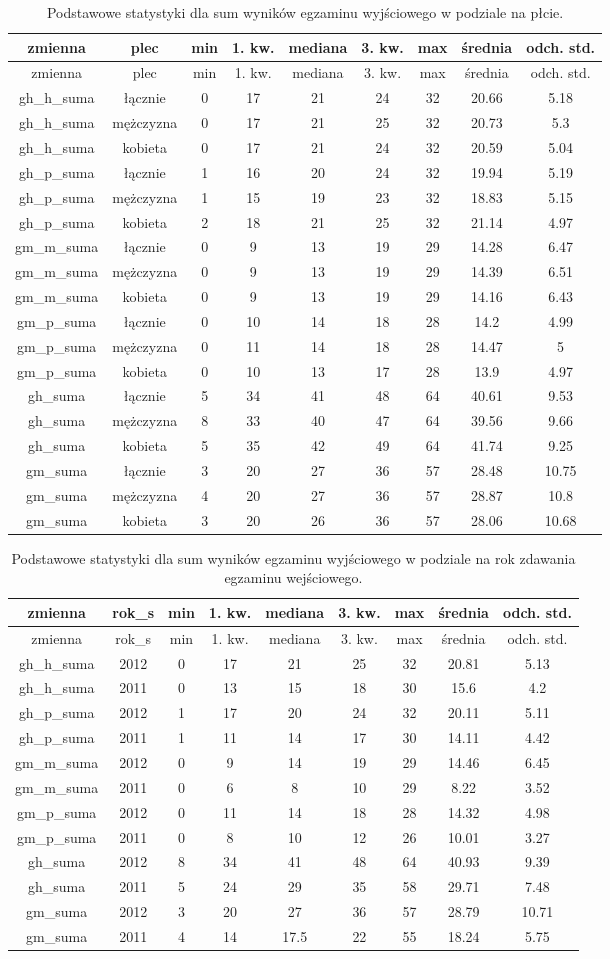 \documentclass[]{article}
\begin{document}
\begin{longtable}[c]{@{}ccccccccc@{}}
\caption{Podstawowe statystyki dla sum wyników egzaminu wyjściowego w
podziale na płcie.}\tabularnewline
\toprule
zmienna & plec & min & 1. kw. & mediana & 3. kw. & max & średnia & odch.
std.\tabularnewline
\midrule
\endfirsthead
\toprule
zmienna & plec & min & 1. kw. & mediana & 3. kw. & max & średnia & odch.
std.\tabularnewline
\midrule
\endhead
gh\_h\_suma & łącznie & 0 & 17 & 21 & 24 & 32 & 20.66 &
5.18\tabularnewline
gh\_h\_suma & mężczyzna & 0 & 17 & 21 & 25 & 32 & 20.73 &
5.3\tabularnewline
gh\_h\_suma & kobieta & 0 & 17 & 21 & 24 & 32 & 20.59 &
5.04\tabularnewline
gh\_p\_suma & łącznie & 1 & 16 & 20 & 24 & 32 & 19.94 &
5.19\tabularnewline
gh\_p\_suma & mężczyzna & 1 & 15 & 19 & 23 & 32 & 18.83 &
5.15\tabularnewline
gh\_p\_suma & kobieta & 2 & 18 & 21 & 25 & 32 & 21.14 &
4.97\tabularnewline
gm\_m\_suma & łącznie & 0 & 9 & 13 & 19 & 29 & 14.28 &
6.47\tabularnewline
gm\_m\_suma & mężczyzna & 0 & 9 & 13 & 19 & 29 & 14.39 &
6.51\tabularnewline
gm\_m\_suma & kobieta & 0 & 9 & 13 & 19 & 29 & 14.16 &
6.43\tabularnewline
gm\_p\_suma & łącznie & 0 & 10 & 14 & 18 & 28 & 14.2 &
4.99\tabularnewline
gm\_p\_suma & mężczyzna & 0 & 11 & 14 & 18 & 28 & 14.47 &
5\tabularnewline
gm\_p\_suma & kobieta & 0 & 10 & 13 & 17 & 28 & 13.9 &
4.97\tabularnewline
gh\_suma & łącznie & 5 & 34 & 41 & 48 & 64 & 40.61 & 9.53\tabularnewline
gh\_suma & mężczyzna & 8 & 33 & 40 & 47 & 64 & 39.56 &
9.66\tabularnewline
gh\_suma & kobieta & 5 & 35 & 42 & 49 & 64 & 41.74 & 9.25\tabularnewline
gm\_suma & łącznie & 3 & 20 & 27 & 36 & 57 & 28.48 &
10.75\tabularnewline
gm\_suma & mężczyzna & 4 & 20 & 27 & 36 & 57 & 28.87 &
10.8\tabularnewline
gm\_suma & kobieta & 3 & 20 & 26 & 36 & 57 & 28.06 &
10.68\tabularnewline
\bottomrule
\end{longtable}

\begin{longtable}[c]{@{}ccccccccc@{}}
\caption{Podstawowe statystyki dla sum wyników egzaminu wyjściowego w
podziale na rok zdawania egzaminu wejściowego.}\tabularnewline
\toprule
zmienna & rok\_s & min & 1. kw. & mediana & 3. kw. & max & średnia &
odch. std.\tabularnewline
\midrule
\endfirsthead
\toprule
zmienna & rok\_s & min & 1. kw. & mediana & 3. kw. & max & średnia &
odch. std.\tabularnewline
\midrule
\endhead
gh\_h\_suma & 2012 & 0 & 17 & 21 & 25 & 32 & 20.81 & 5.13\tabularnewline
gh\_h\_suma & 2011 & 0 & 13 & 15 & 18 & 30 & 15.6 & 4.2\tabularnewline
gh\_p\_suma & 2012 & 1 & 17 & 20 & 24 & 32 & 20.11 & 5.11\tabularnewline
gh\_p\_suma & 2011 & 1 & 11 & 14 & 17 & 30 & 14.11 & 4.42\tabularnewline
gm\_m\_suma & 2012 & 0 & 9 & 14 & 19 & 29 & 14.46 & 6.45\tabularnewline
gm\_m\_suma & 2011 & 0 & 6 & 8 & 10 & 29 & 8.22 & 3.52\tabularnewline
gm\_p\_suma & 2012 & 0 & 11 & 14 & 18 & 28 & 14.32 & 4.98\tabularnewline
gm\_p\_suma & 2011 & 0 & 8 & 10 & 12 & 26 & 10.01 & 3.27\tabularnewline
gh\_suma & 2012 & 8 & 34 & 41 & 48 & 64 & 40.93 & 9.39\tabularnewline
gh\_suma & 2011 & 5 & 24 & 29 & 35 & 58 & 29.71 & 7.48\tabularnewline
gm\_suma & 2012 & 3 & 20 & 27 & 36 & 57 & 28.79 & 10.71\tabularnewline
gm\_suma & 2011 & 4 & 14 & 17.5 & 22 & 55 & 18.24 & 5.75\tabularnewline
\bottomrule
\end{longtable}
\end{document}
